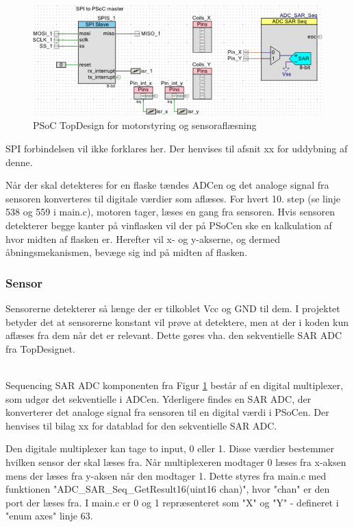 \begin{figure}[H]
\includegraphics[scale=0.48]{Screenshots/PSoC_TopDesign_X_Y.png}
\caption{PSoC TopDesign for motorstyring og sensoraflæsning}
\label{PSoC_TopDesign_X_Y}
\end{figure}

SPI forbindelsen vil ikke forklares her. Der henvises til afsnit xx for uddybning af denne.

Når der skal detekteres for en flaske tændes ADCen og det analoge signal fra sensoren konverteres til digitale værdier som aflæses. For hvert 10. step (se linje 538 og 559 i main.c), motoren tager, læses en gang fra sensoren. Hvis sensoren detekterer begge kanter på vinflasken vil der på PSoCen ske en kalkulation af hvor midten af flasken er. Herefter vil x- og y-akserne, og dermed åbningsmekanismen, bevæge sig ind på midten af flasken.

\subsubsection{Sensor}
Sensorerne detekterer så længe der er tilkoblet Vcc og GND til dem. I projektet betyder det at sensorerne konstant vil prøve at detektere, men at der i koden kun aflæses fra dem når det er relevant. Dette gøres vha. den sekventielle SAR ADC fra TopDesignet.

 \\
Sequencing SAR ADC komponenten fra Figur \ref{PSoC_TopDesign_X_Y} består af en digital multiplexer, som udgør det sekventielle i ADCen. Yderligere findes en SAR ADC, der konverterer det analoge signal fra sensoren til en digital værdi i PSoCen. Der henvises til bilag xx for datablad for den sekventielle SAR ADC.

Den digitale multiplexer kan tage to input, 0 eller 1. Disse værdier bestemmer hvilken sensor der skal læses fra. Når multiplexeren modtager 0 læses fra x-aksen mens der læses fra y-aksen når den modtager 1. Dette styres fra main.c med funktionen "ADC\_SAR\_Seq\_GetResult16(uint16 chan)", hvor "chan" er den port der læses fra. I main.c er 0 og 1 repræsenteret som "X" og "Y" - defineret i "enum axes" linje 63.

